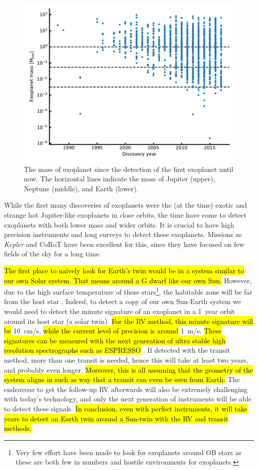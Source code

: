 \begin{figure}[htpb!]
    \centering
    \includegraphics[width=0.8\linewidth]{figures/exoplanetMass.pdf}
    \caption{The mass of exoplanet since the detection of the first exoplanet until now. The
             horizontal lines indicate the mass of Jupiter (upper), Neptune (middle), and Earth
             (lower).}
    \label{fig:exoplanetMass}
\end{figure}

While the first many discoveries of exoplanets were the (at the time) exotic and strange hot
Jupiter-like exoplanets in close orbits, the time have come to detect exoplanets with both lower
mass and wider orbits. It is crucial to have high precision instruments and long surveys to detect
these exoplanets. Missions as \emph{Kepler} and CoRoT have been excellent for this, since they have
focused on few fields of the sky for a long time.

\hl{The first place to naively look for Earth's twin would be in a system similar to our own Solar
system. That means around a G dwarf like our own Sun.} However, due to the high surface temperature
of these stars\footnote{Very few effort have been made to look for exoplanets around OB stars as
these are both few in numbers and hostile environments for exoplanets.}, the habitable zone will be
far from the host star \citep[see e.g.][]{Kasting1993}. Indeed, to detect a copy of our own
Sun-Earth system we would need to detect the minute signature of an exoplanet in a \SI{1}{year}
orbit around its host star (a solar twin). \hl{For the RV method, this minute signature will be}
\SI{10}{cm/s}, \hl{while the current level of precision is around} \SI{1}{m/s}. \hl{These signatures
can be measured with the next generation of ultra stable high resolution spectrographs such as
ESPRESSO} \citep{ESPRESSO}. If detected with the transit method, more than one transit is needed,
hence this will take at least two years, and probably even longer. \hl{Moreover, this is all
assuming that the geometry of the system aligns in such as way that a transit can even be seen from
Earth.} The endeavour to get the follow-up RV afterwards will also be extremely challenging with
today's technology, and only the next generation of instruments will be able to detect these
signals. \hl{In conclusion, even with perfect instruments, it will take years to detect an Earth
twin around a Sun-twin with the RV and transit methods.}

